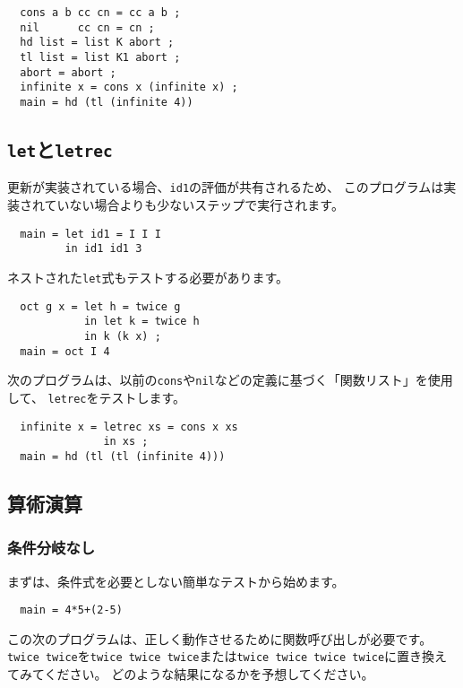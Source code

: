 \documentclass{jarticle}
\begin{document}
\begin{verbatim}
  cons a b cc cn = cc a b ;
  nil      cc cn = cn ;
  hd list = list K abort ;
  tl list = list K1 abort ;
  abort = abort ;
  infinite x = cons x (infinite x) ;
  main = hd (tl (infinite 4))
\end{verbatim}
\newpage

\subsection{\texttt{let}と\texttt{letrec}}

更新が実装されている場合、\texttt{id1}の評価が共有されるため、
このプログラムは実装されていない場合よりも少ないステップで実行されます。

\begin{verbatim}
  main = let id1 = I I I
         in id1 id1 3
\end{verbatim}

ネストされた\texttt{let}式もテストする必要があります。

\begin{verbatim}
  oct g x = let h = twice g
            in let k = twice h
            in k (k x) ;
  main = oct I 4
\end{verbatim}

次のプログラムは、以前の\texttt{cons}や\texttt{nil}などの定義に基づく「関数リスト」を使用して、
\texttt{letrec}をテストします。

\begin{verbatim}
  infinite x = letrec xs = cons x xs
               in xs ;
  main = hd (tl (tl (infinite 4)))
\end{verbatim}
\newpage

\subsection{算術演算}

\subsubsection{条件分岐なし}

まずは、条件式を必要としない簡単なテストから始めます。

\begin{verbatim}
  main = 4*5+(2-5)
\end{verbatim}

この次のプログラムは、正しく動作させるために関数呼び出しが必要です。
\texttt{twice twice}を\texttt{twice twice twice}または\texttt{twice twice twice twice}に置き換えてみてください。
どのような結果になるかを予想してください。
\end{document}
